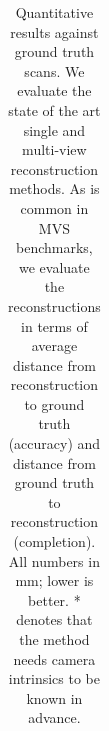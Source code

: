 \documentclass[10pt,twocolumn,letterpaper]{article}
\begin{document}
\begin{table}
\begin{center}
\begin{tabular}{|c|c|c c c|c c c|}
\hline
\end{tabular}
\end{center}
\caption{Quantitative results against ground truth scans. We evaluate the state of the art single and multi-view reconstruction methods. As is common in MVS benchmarks, we evaluate the reconstructions in terms of average distance from reconstruction to ground truth (accuracy) and distance from ground truth to reconstruction (completion). All numbers in mm; lower is better. * denotes that the method needs camera intrinsics to be known in advance.}
\label{table:results}
\end{table}






\end{document}
